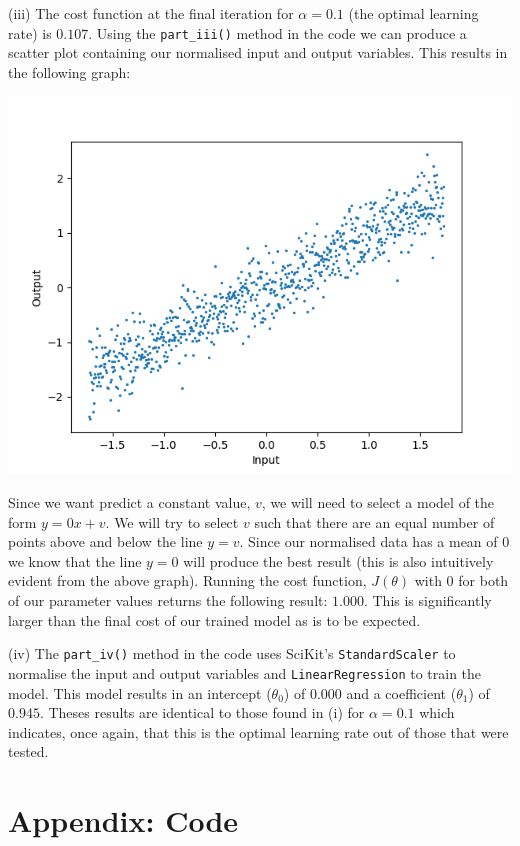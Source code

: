 \documentclass[12pt]{article}
\begin{document}
\noindent (iii) The cost function at the final iteration for $\alpha = 0.1$ (the optimal learning rate) is $0.107$. Using the \texttt{part\_iii()} method in the code we can produce a scatter plot containing our normalised input and output variables. This results in the following graph:

\begin{center}
    \includegraphics[scale=0.6]{fig_5.png}
\end{center}

Since we want predict a constant value, $v$, we will need to select a model of the form $y = 0x + v$. We will try to select $v$ such that there are an equal number of points above and below the line $y = v$. Since our normalised data has a mean of $0$ we know that the line $y = 0$ will produce the best result (this is also intuitively evident from the above graph). Running the cost function, $J(\theta)$ with $0$ for both of our parameter values returns the following result: $1.000$. This is significantly larger than the final cost of our trained model as is to be expected.

\noindent (iv) The \texttt{part\_iv()} method in the code uses SciKit's \texttt{StandardScaler} to normalise the input and output variables and \texttt{LinearRegression} to train the model. This model results in an intercept ($\theta_0$) of $0.000$ and a coefficient ($\theta_1$) of $0.945$. Theses results are identical to those found in (i) for $\alpha = 0.1$ which indicates, once again, that this is the optimal learning rate out of those that were tested.

\section*{Appendix: Code}
\end{document}
